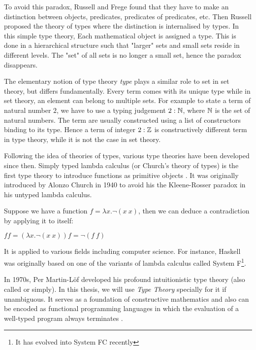 To avoid this paradox, Russell and Frege found that they have to make an distinction between objects, predicates, predicates of predicates, etc. Then Russell proposed the theory of types \cite{rus:1903} where the distinction is internalised by types.
In this simple type theory, Each mathematical object is assigned a type. This is done in a hierarchical structure such that "larger" sets and small sets reside in different levels. The "set" of all
sets is no longer a small set, hence the
paradox disappears.

The elementary notion of type theory \emph{type} plays a similar role to set in set theory, but differs fundamentally. Every term comes with its unique type while in set theory, an element can belong to multiple sets.
For example to state a term of natural number $2$, we have to use a typing judgement $2:\mathbb{N}$, where $\mathbb{N}$ is the set of natural numbers. The term are usually constructed using a list of constructors binding to its type. Hence a term of integer $2 : \mathbb{Z}$ is constructively different term in type theory, while it is not the case in set theory.

Following the idea of theories of types, various type theories have been developed since then. 
Simply typed lambda calculus (or Church's theory of types) is the first type theory to introduce functions as primitive objects \cite{sep-type-theory}. It was originally introduced by Alonzo Church in 1940 to avoid his
the Kleene-Rosser paradox\cite{kleene1935inconsistency} in his untyped lambda calculus.

\begin{example}
Suppose we have a function $f = \lambda x . \neg (x ~ x) $, then we can deduce a contradiction by applying it to itself:

$f f = (\lambda x . \neg (x ~ x)) f = \neg (f ~ f)$
\end{example}

It is applied to various fields including computer science. For instance, Haskell was originally based on one of the variants of lambda calculus called System F\footnote{It has evolved into System FC recently}. 



In 1970s, Per Martin-L\"{o}f \cite{per:71,per:82} developed his profound intuitionistic type theory (also called \mltt or simply). In this thesis, we will use \emph{Type Theory} specially for it if unambiguous.
It serves as a foundation of constructive mathematics \cite{martin1984intuitionistic} and also can be encoded as functional programming languages \cite{DBLP:dblp_journals/tcs/Troelstra99} in
which the evaluation of a well-typed program always terminates \cite{nor:90}. 


